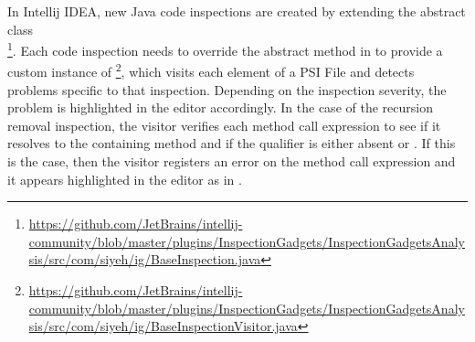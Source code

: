 In Intellij IDEA, new Java code inspections are created by extending the abstract class\\
\footnote{\url{https://github.com/JetBrains/intellij-community/blob/master/plugins/InspectionGadgets/InspectionGadgetsAnalysis/src/com/siyeh/ig/BaseInspection.java}}.
Each code inspection needs to override the abstract method  in 
to provide a custom instance of \footnote{\url{https://github.com/JetBrains/intellij-community/blob/master/plugins/InspectionGadgets/InspectionGadgetsAnalysis/src/com/siyeh/ig/BaseInspectionVisitor.java}},
which visits each element of a PSI File and detects problems specific to that inspection. Depending on the inspection
severity, the problem is highlighted in the editor accordingly. In the case of the recursion removal inspection,
the visitor verifies each method call expression to see if it resolves to the containing method and if the qualifier
is either absent or . If this is the case, then the visitor registers an error on the method call expression
and it appears highlighted in the editor as in .

